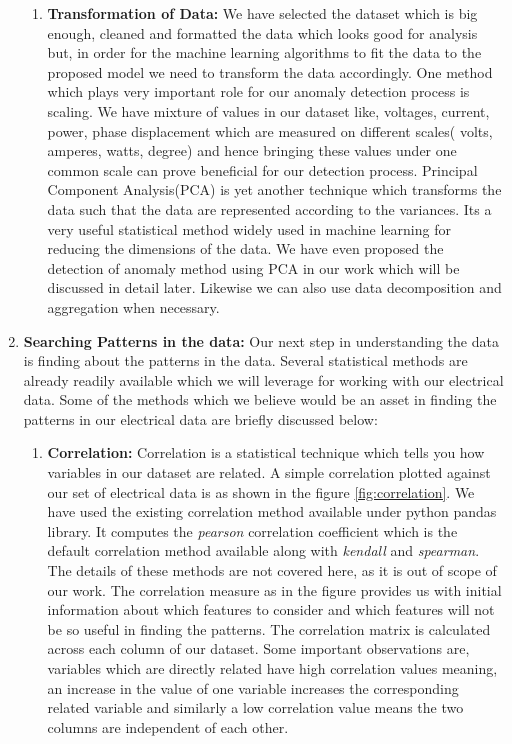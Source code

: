 \begin{enumerate}
\begin{enumerate}
		\item\textbf{Transformation of Data:} We have selected the dataset which is big enough, cleaned and formatted the data which looks good for analysis but, in order for the machine learning algorithms to fit the data to the proposed model we need to transform the data accordingly. One method which plays very important role for our anomaly detection process is scaling. We have mixture of values in our dataset like, voltages, current, power, phase displacement which are measured on different scales( volts, amperes, watts, degree) and hence bringing these values under one common scale can prove beneficial for our detection process. Principal Component Analysis(PCA) is yet another technique which transforms the data such that the data are represented according to the variances. Its a very useful statistical method widely used in machine learning for reducing the dimensions of the data. We have even proposed the detection of anomaly method using PCA in our work which will be discussed in detail later. Likewise we can also use data decomposition and aggregation when necessary. 
	\end{enumerate}



\item\textbf{Searching Patterns in the data:} Our next step in understanding the data is finding about the patterns in the data. Several statistical methods are already readily available which we will leverage for working with our electrical data. Some of the methods which we believe would be an asset in finding the patterns in our electrical data are briefly discussed below:
\begin{enumerate}
\item\textbf{Correlation:} Correlation is a statistical technique which tells you how variables in our dataset are related. A simple correlation plotted against our set of electrical data is as shown in the figure \ref{fig:correlation}. We have used the existing correlation method available under python pandas library. It computes the \textit{pearson} correlation coefficient which is the default correlation method available along with \textit{kendall} and \textit{spearman}. The details of these methods are not covered here, as it is out of scope of our work. The correlation measure as in the figure provides us with initial information about which features to consider and which features will not be so useful in finding the patterns. The correlation matrix is calculated across each column of our dataset. Some important observations are, variables which are directly related have high correlation values meaning, an increase in the value of one variable increases the corresponding related variable and similarly a low correlation value means the two columns are independent of each other. 


\end{enumerate}
\end{enumerate}
